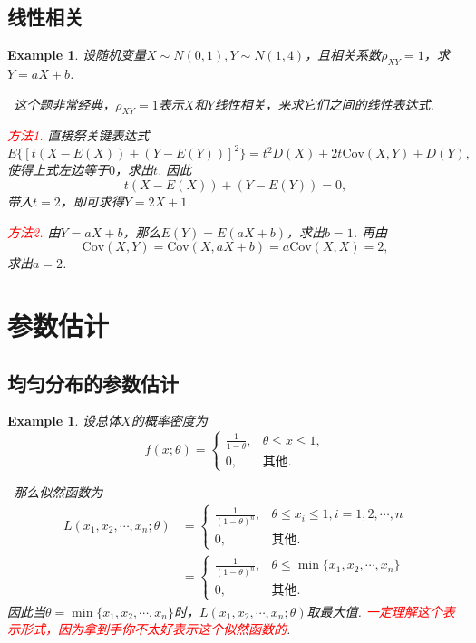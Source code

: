 \documentclass{article}
\newtheorem{example}[theorem]{Example}
\newcommand{\redt}[1]{\textcolor{red}{#1}}
\newcommand{\hints}{{\color{blue} \text{hints}}}
\begin{document}
\subsection{线性相关}

\begin{example}
\rm 设随机变量$X \sim N(0,1), Y \sim N(1,4)$，且相关系数$\rho_{XY} = 1$，求$Y=aX+b$. 

\hints\ 这个题非常经典，$\rho_{XY} = 1$表示$X$和$Y$线性相关，来求它们之间的线性表达式. 

\redt{方法1.} 直接祭关键表达式
$$
E\{[t(X-E(X)) + (Y-E(Y))]^2\} = t^2D(X)+2t\text{Cov}(X,Y)+D(Y),
$$
使得上式左边等于$0$，求出$t$. 因此
$$
t(X-E(X)) + (Y-E(Y)) = 0,
$$
带入$t=2$，即可求得$Y=2X+1$. 

\redt{方法2.} 由$Y=aX+b$，那么$E(Y)=E(aX+b)$，求出$b = 1$. 再由
$$
\text{Cov}(X,Y) = \text{Cov}(X,aX+b) = a\text{Cov}(X,X) = 2,
$$
求出$a=2$.  
\end{example}

\section{参数估计}

\subsection{均匀分布的参数估计}

\begin{example}
\rm 设总体$X$的概率密度为
$$
f(x;\theta) = \left\{
\begin{array}{ll}
\frac{1}{1-\theta}, & \theta\leq x \leq 1, \\
0, & \text{其他}. 
\end{array} \right. 
$$

\hints\ 那么似然函数为
$$
\begin{aligned}
L(x_1,x_2,\cdots,x_n;\theta) &= 
\left\{
\begin{array}{ll}
\frac{1}{(1-\theta)^n}, & \theta\leq x_i \leq 1, i=1,2,\cdots,n\\
0, & \text{其他}. 
\end{array} \right. \\
&= \left\{
\begin{array}{ll}
\frac{1}{(1-\theta)^n}, & \theta\leq \min\{x_1,x_2,\cdots,x_n\} \\
0, & \text{其他}. 
\end{array} \right.
\end{aligned}
$$
因此当$\theta = \min\{x_1,x_2,\cdots,x_n\}$时，$L(x_1,x_2,\cdots,x_n;\theta)$取最大值. \redt{一定理解这个表示形式，因为拿到手你不太好表示这个似然函数的}. 
\end{example}
\end{document}
